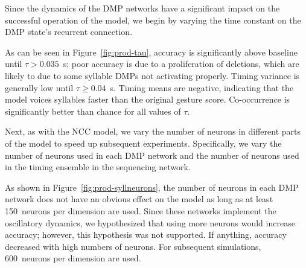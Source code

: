 Since the dynamics of the DMP networks
have a significant impact
on the successful operation of the model,
we begin by varying
the time constant on
the DMP state's recurrent connection.


As can be seen in Figure~\ref{fig:prod-tau},
accuracy is significantly above baseline
until $\tau > 0.035$~s;
poor accuracy is due to a proliferation
of deletions,
which are likely to due to some syllable DMPs
not activating properly.
Timing variance is generally low
until $\tau \ge 0.04$~s.
Timing means are negative,
indicating that the model
voices syllables faster
than the original gesture score.
Co-occurrence is significantly
better than chance for all values of $\tau$.

Next, as with the NCC model,
we vary the number of neurons
in different parts of the model
to speed up subsequent experiments.
Specifically, we vary the number of neurons
used in each DMP network and
the number of neurons used in the
timing ensemble in the sequencing network.


As shown in Figure~\ref{fig:prod-syllneurons},
the number of neurons in each DMP network
does not have an obvious effect
on the model as long as at least
150~neurons per dimension are used.
Since these networks implement
the oscillatory dynamics, we hypothesized
that using more neurons would
increase accuracy;
however, this hypothesis was not supported.
If anything, accuracy decreased with
high numbers of neurons.
For subsequent simulations,
600~neurons per dimension are used.

